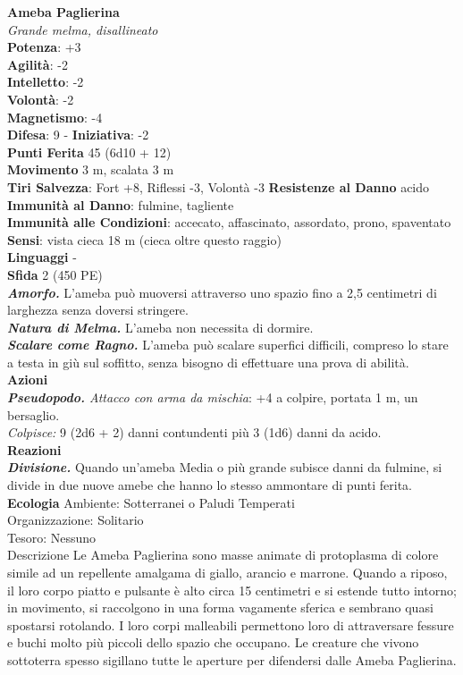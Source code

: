 \begin{multicols}{2}
\medskip\textbf{Ameba Paglierina}\\
\emph{Grande melma, disallineato}\\
\textbf{Potenza}: +3\\
\textbf{Agilità}: -2\\
\textbf{Intelletto}: -2\\
\textbf{Volontà}: -2\\
\textbf{Magnetismo}: -4\\
\textbf{Difesa}: 9 - \textbf{Iniziativa}: -2\\
\textbf{Punti Ferita} 45 (6d10 + 12)\\
\textbf{Movimento} 3 m, scalata 3 m\\
\textbf{Tiri Salvezza}: Fort +8, Riflessi -3, Volontà -3
\textbf{Resistenze al Danno} acido\\
\textbf{Immunità al Danno}: fulmine, tagliente\\
\textbf{Immunità alle Condizioni}: accecato, affascinato, assordato, prono, spaventato\\
\textbf{Sensi}: vista cieca 18 m (cieca oltre questo raggio)\\
\textbf{Linguaggi} -\\
\textbf{Sfida} 2 (450 PE)\smallskip\\
\emph{\textbf{Amorfo.}} L'ameba può muoversi attraverso uno spazio fino a 2,5 centimetri di larghezza senza doversi stringere.\\
\emph{\textbf{Natura di Melma.}} L'ameba non necessita di dormire.\\
\emph{\textbf{Scalare come Ragno.}} L'ameba può scalare superfici difficili, compreso lo stare a testa in giù sul soffitto, senza bisogno di effettuare una prova di abilità.\\
\smallskip\textbf{Azioni}\\
\emph{\textbf{Pseudopodo.} Attacco con arma da mischia}: +4 a colpire, portata 1 m, un bersaglio.\\
\emph{Colpisce:} 9 (2d6 + 2) danni contundenti più 3 (1d6) danni da acido.\\
\textbf{Reazioni}\\
\emph{\textbf{Divisione.}} Quando un'ameba Media o più grande subisce
danni da fulmine, si divide in due nuove amebe che hanno lo stesso ammontare di punti ferita.\\
\textbf{Ecologia}
Ambiente: Sotterranei o Paludi Temperati\\
Organizzazione: Solitario\\
Tesoro: Nessuno\\
Descrizione
Le Ameba Paglierina sono masse animate di protoplasma di colore simile ad un repellente amalgama di giallo, arancio e marrone. Quando a riposo, il loro corpo piatto e pulsante è alto circa 15 centimetri e si estende tutto intorno; in movimento, si raccolgono in una forma vagamente sferica e sembrano quasi spostarsi rotolando. I loro corpi malleabili permettono loro di attraversare fessure e buchi molto più piccoli dello spazio che occupano. Le creature che vivono sottoterra spesso sigillano tutte le aperture per difendersi dalle Ameba Paglierina.\\


\end{multicols}
